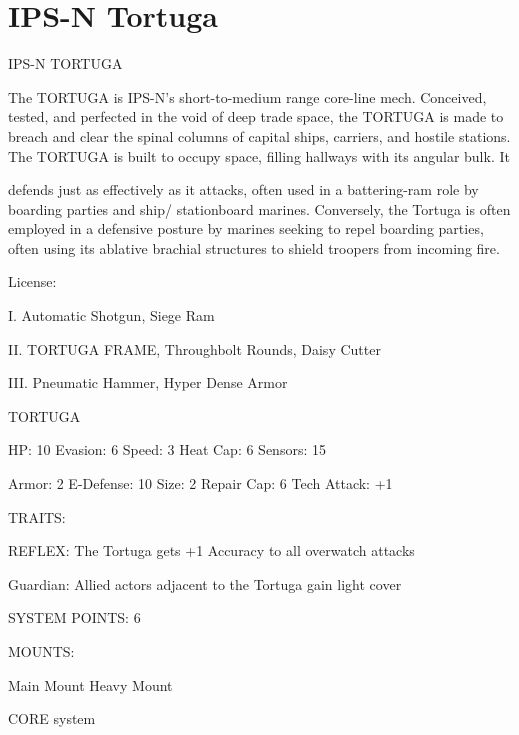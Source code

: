 \section{IPS-N Tortuga}

                                                   IPS-N TORTUGA

The TORTUGA is IPS-N’s short-to-medium range core-line mech. Conceived, tested, and perfected in the
void of deep trade space, the TORTUGA is made to breach and clear the spinal columns of capital ships,
carriers, and hostile stations. The TORTUGA is built to occupy space, filling hallways with its angular bulk. It




defends just as effectively as it attacks, often used in a battering-ram role by boarding parties and ship/
stationboard marines. Conversely, the Tortuga is often employed in a defensive posture by marines seeking
to repel boarding parties, often using its ablative brachial structures to shield troopers from incoming fire.

                                                   License:

I. Automatic Shotgun, Siege Ram

II. TORTUGA FRAME, Throughbolt Rounds, Daisy Cutter

III. Pneumatic Hammer, Hyper Dense Armor


                                                 TORTUGA

  HP: 10         Evasion: 6                            Speed: 3           Heat Cap: 6        Sensors: 15

  Armor: 2       E-Defense: 10                         Size: 2            Repair Cap: 6      Tech Attack:
                                                                                             +1

                                                   TRAITS:

  REFLEX: The Tortuga gets +1 Accuracy to all overwatch attacks

  Guardian: Allied actors adjacent to the Tortuga gain light cover

                                             SYSTEM POINTS: 6

                                                   MOUNTS:

  Main Mount                        Heavy Mount

                                                CORE system




